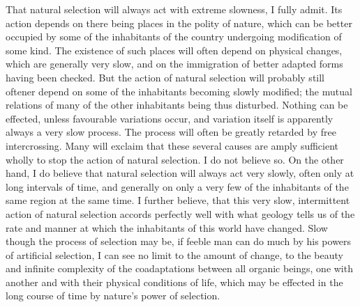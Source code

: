 That natural selection will always act with extreme slowness, I fully admit. Its action depends on there being places in the polity of nature, which can be better occupied by some of the inhabitants of the country undergoing modification of some kind. The existence of such places will often depend on physical changes, which are generally very slow, and on the immigration of better adapted forms having been checked. But the action of natural selection will probably still oftener depend on some of the inhabitants becoming slowly modified; the mutual relations of many of the other inhabitants being thus disturbed. Nothing can be effected, unless favourable variations occur, and variation itself is apparently always a very slow process. The process will often be greatly retarded by free intercrossing. Many will exclaim that these several causes are amply sufficient wholly to stop the action of natural selection. I do not believe so. On the other hand, I do believe that natural selection will always act very slowly, often only at long intervals of time, and generally on only a very few of the inhabitants of the same region at the same time. I further believe, that this very slow, intermittent action of natural selection accords perfectly well with what geology tells us of the rate and manner at which the inhabitants of this world have changed.
Slow though the process of selection may be, if feeble man can do much by his powers of artificial selection, I can see no limit to the amount of change, to the beauty and infinite complexity of the coadaptations between all organic beings, one with another and with their physical conditions of life, which may be effected in the long course of time by nature's power of selection.

